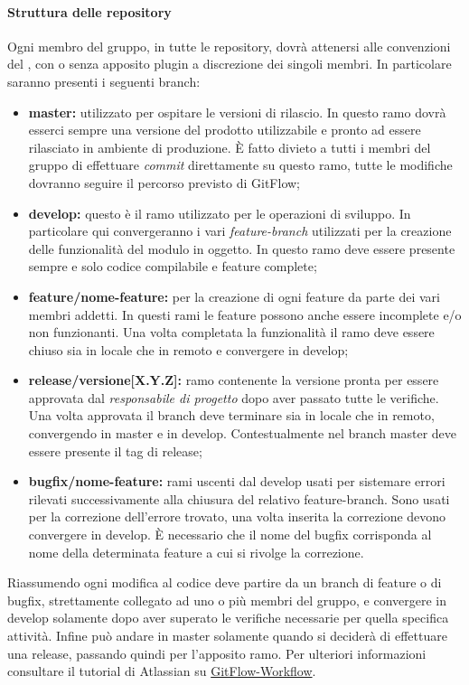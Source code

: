 \paragraph{Struttura delle repository}
Ogni membro del gruppo, in tutte le repository, dovrà attenersi alle convenzioni del , con o senza apposito plugin a discrezione dei singoli membri.
In particolare saranno presenti i seguenti branch:
\begin{itemize}
    \item \textbf{master:} utilizzato per ospitare le versioni di rilascio. In questo ramo dovrà esserci sempre una versione del prodotto utilizzabile
          e pronto ad essere rilasciato in ambiente di produzione. È fatto divieto a tutti i membri del gruppo di effettuare \textit{commit}
          direttamente su questo ramo, tutte le modifiche dovranno seguire il percorso previsto di GitFlow;
    \item \textbf{develop:} questo è il ramo utilizzato per le operazioni di sviluppo. In particolare qui convergeranno i vari \textit{feature-branch}
          utilizzati per la creazione delle funzionalità del modulo in oggetto. In questo ramo deve essere presente sempre e solo codice
          compilabile e feature complete;
    \item \textbf{feature/nome-feature:} per la creazione di ogni feature da parte dei vari membri addetti. In questi rami le feature possono anche essere
          incomplete e/o non funzionanti. Una volta completata la funzionalità il ramo deve essere chiuso sia in locale che in remoto e
          convergere in develop;
    \item \textbf{release/versione[X.Y.Z]:} ramo contenente la versione  pronta per essere approvata dal \textit{responsabile di progetto} dopo
          aver passato tutte le verifiche. Una volta approvata il branch deve terminare sia in locale che in remoto, convergendo in master e in develop.
          Contestualmente nel branch master deve essere presente il tag di release;
    \item \textbf{bugfix/nome-feature:} rami uscenti dal develop usati per sistemare errori rilevati successivamente alla chiusura del relativo feature-branch.
          Sono usati per la correzione dell'errore trovato, una volta inserita la correzione devono convergere in develop. È necessario
          che il nome del bugfix corrisponda al nome della determinata feature a cui si rivolge la correzione.
\end{itemize}
Riassumendo ogni modifica al codice deve partire da un branch di feature o di bugfix, strettamente collegato ad uno o più membri del gruppo, e convergere in develop solamente dopo
aver superato le verifiche necessarie per quella specifica attività.
Infine può andare in master solamente quando si deciderà di effettuare una release, passando quindi per l'apposito ramo.
Per ulteriori informazioni consultare il tutorial di Atlassian su \href{https://www.atlassian.com/git/tutorials/comparing-workflows/gitflow-workflow}{GitFlow-Workflow}.

